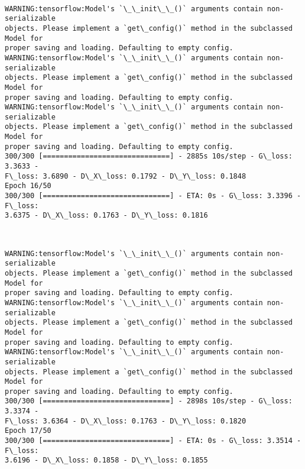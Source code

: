 \documentclass[11pt]{article}
\begin{document}
    \begin{center}
    \end{center}
    { \hspace*{\fill} \\}
    
    \begin{Verbatim}[commandchars=\\\{\}]
WARNING:tensorflow:Model's `\_\_init\_\_()` arguments contain non-serializable
objects. Please implement a `get\_config()` method in the subclassed Model for
proper saving and loading. Defaulting to empty config.
WARNING:tensorflow:Model's `\_\_init\_\_()` arguments contain non-serializable
objects. Please implement a `get\_config()` method in the subclassed Model for
proper saving and loading. Defaulting to empty config.
WARNING:tensorflow:Model's `\_\_init\_\_()` arguments contain non-serializable
objects. Please implement a `get\_config()` method in the subclassed Model for
proper saving and loading. Defaulting to empty config.
300/300 [==============================] - 2885s 10s/step - G\_loss: 3.3633 -
F\_loss: 3.6890 - D\_X\_loss: 0.1792 - D\_Y\_loss: 0.1848
Epoch 16/50
300/300 [==============================] - ETA: 0s - G\_loss: 3.3396 - F\_loss:
3.6375 - D\_X\_loss: 0.1763 - D\_Y\_loss: 0.1816
    \end{Verbatim}

    \begin{center}
    \end{center}
    { \hspace*{\fill} \\}
    
    \begin{Verbatim}[commandchars=\\\{\}]
WARNING:tensorflow:Model's `\_\_init\_\_()` arguments contain non-serializable
objects. Please implement a `get\_config()` method in the subclassed Model for
proper saving and loading. Defaulting to empty config.
WARNING:tensorflow:Model's `\_\_init\_\_()` arguments contain non-serializable
objects. Please implement a `get\_config()` method in the subclassed Model for
proper saving and loading. Defaulting to empty config.
WARNING:tensorflow:Model's `\_\_init\_\_()` arguments contain non-serializable
objects. Please implement a `get\_config()` method in the subclassed Model for
proper saving and loading. Defaulting to empty config.
300/300 [==============================] - 2898s 10s/step - G\_loss: 3.3374 -
F\_loss: 3.6364 - D\_X\_loss: 0.1763 - D\_Y\_loss: 0.1820
Epoch 17/50
300/300 [==============================] - ETA: 0s - G\_loss: 3.3514 - F\_loss:
3.6196 - D\_X\_loss: 0.1858 - D\_Y\_loss: 0.1855
    \end{Verbatim}
\end{document}
